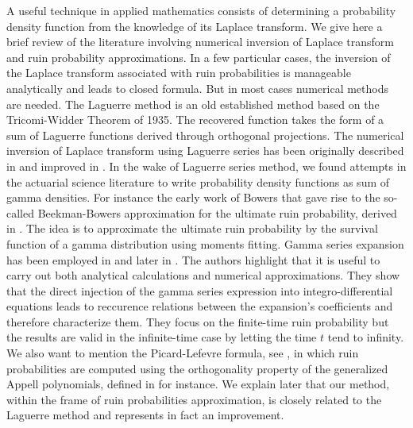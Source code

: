 A useful technique in applied mathematics consists of determining a probability density function from the knowledge of its Laplace transform. We give here a brief review of the literature involving numerical inversion of Laplace transform and ruin probability approximations. In a few particular cases, the inversion of the Laplace transform associated with ruin probabilities is manageable analytically and leads to closed formula. But in most cases numerical methods are needed. The Laguerre method is an old established method based on the Tricomi-Widder Theorem of 1935. The recovered function takes the form of a sum of Laguerre functions derived through orthogonal projections. The numerical inversion of Laplace transform using Laguerre series has been originally described in \citet{We66} and improved in \citet{AbChWh95}. In the wake of Laguerre series method, we found attempts in the actuarial science literature to write probability density functions as sum of gamma densities. For instance the early work of Bowers \citet{Bo66} that  gave rise to the so-called Beekman-Bowers approximation for the ultimate ruin probability, derived in \citet{Be69}. The idea is to approximate the ultimate ruin probability by the survival function of a gamma distribution using moments fitting. Gamma series expansion has been employed  in \citet{Ta78} and later in \citet{AlTeTi01}. The authors highlight that it is useful to carry out both analytical calculations and numerical approximations. They show that the direct injection of the gamma series expression into integro-differential equations leads to reccurence relations between the expansion\rq{}s coefficients and therefore characterize them. They focus on the finite-time ruin probability but the results are valid in the infinite-time case by letting the time $t$ tend to infinity. We also want to mention the Picard-Lefevre formula, see \citet{PiLe97,RuLo04}, in which ruin probabilities are computed using the orthogonality property of the generalized Appell polynomials, defined in \citet{Po01} for instance. We explain later that our method, within the frame of ruin probabilities approximation, is closely related to the Laguerre method and represents in fact an improvement.\\

